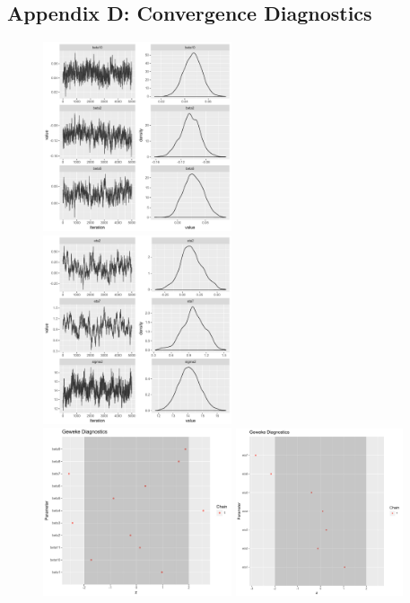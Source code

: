 \documentclass[ba]{imsart}
\numberwithin{equation}{section}
\theoremstyle{plain}
\begin{document}
	\subsection*{Appendix D: Convergence Diagnostics}\label{appendix: convergence}
	\begin{figure}[H]
		\centering
		\includegraphics[width=0.495\textwidth]{img/betatrace.pdf}	
		\includegraphics[width=0.495\textwidth]{img/etatrace.pdf}	
		\includegraphics[width=0.495\textwidth]{img/betageweke.pdf}	
		\includegraphics[width=0.44\textwidth]{img/etageweke.pdf}

\end{figure}
\end{document}
